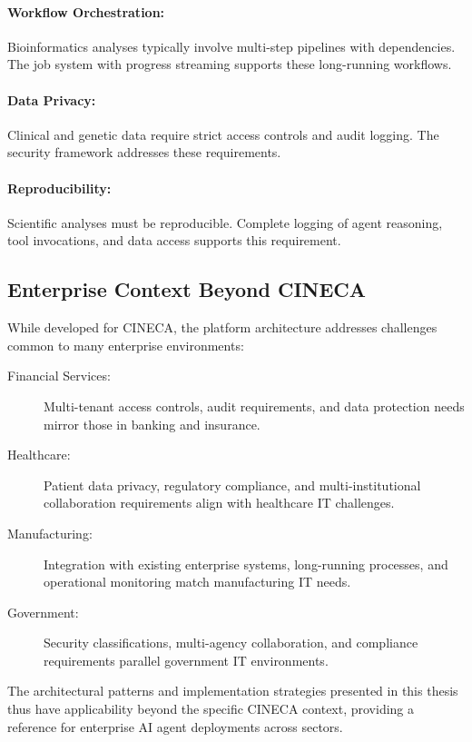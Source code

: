 \paragraph{Workflow Orchestration:}
Bioinformatics analyses typically involve multi-step pipelines with dependencies. The job system with progress streaming supports these long-running workflows.

\paragraph{Data Privacy:}
Clinical and genetic data require strict access controls and audit logging. The security framework addresses these requirements.

\paragraph{Reproducibility:}
Scientific analyses must be reproducible. Complete logging of agent reasoning, tool invocations, and data access supports this requirement.

\subsection{Enterprise Context Beyond CINECA}

While developed for CINECA, the platform architecture addresses challenges common to many enterprise environments:

\begin{description}
    \item[Financial Services:] Multi-tenant access controls, audit requirements, and data protection needs mirror those in banking and insurance.
    
    \item[Healthcare:] Patient data privacy, regulatory compliance, and multi-institutional collaboration requirements align with healthcare IT challenges.
    
    \item[Manufacturing:] Integration with existing enterprise systems, long-running processes, and operational monitoring match manufacturing IT needs.
    
    \item[Government:] Security classifications, multi-agency collaboration, and compliance requirements parallel government IT environments.
\end{description}

The architectural patterns and implementation strategies presented in this thesis thus have applicability beyond the specific CINECA context, providing a reference for enterprise AI agent deployments across sectors.

